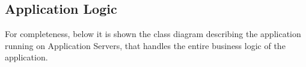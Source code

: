 \documentclass[../../../DD.tex]{subfiles}
\begin{document}
	
	\subsection{Application Logic\label{subsect:2.6.5}}
	
	For completeness, below it is shown the class diagram describing the application running on Application Servers, that handles the entire business logic of the application.
	
	
	\newpage
\end{document}
